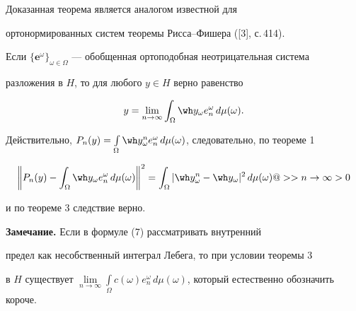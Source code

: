 Доказанная теорема является аналогом известной для


ортонормированных систем теоремы Рисса--Фишера ([3], с.\,414).





\begin{cor}\hspace{-1.8mm}{\bf.}


Если $\{\boldsymbol e^\omega\}_{\omega\in


\Omega}$ --- обобщенная ортоподобная неотрицательная система


разложения в $H$, то для любого $y\in H$ верно равенство


\begin{equation}


y=\lim_{n\to\infty}\int_\Omega \wh y_\omega


e_n^\omega\,d\mu(\omega).


\end{equation}


\end{cor}





Действительно, $P_n(y)=\int\limits_\Omega \wh y^n_\omega


e_n^\omega\,d\mu(\omega)$, следовательно, по теореме 1


$$


\bigg\|P_n(y)-\int_\Omega\wh y_\omega e_n^\omega\,d\mu


(\omega)\bigg\|^2=\int_\Omega |\wh y_\omega^n


-\wh y_\omega|^2\,d\mu(\omega)@>>{n\to\infty}>0


$$


и по теореме 3 следствие верно.


\medskip





{\bf Замечание.} Если в формуле (7) рассматривать внутренний


предел как несобственный интеграл Лебега, то при условии теоремы 3


в $H$ существует $\lim\limits_{n\to\infty}\int\limits_\Omega c(\omega


)e_n^\omega\,d\mu(\omega)$, который естественно обозначить короче.





